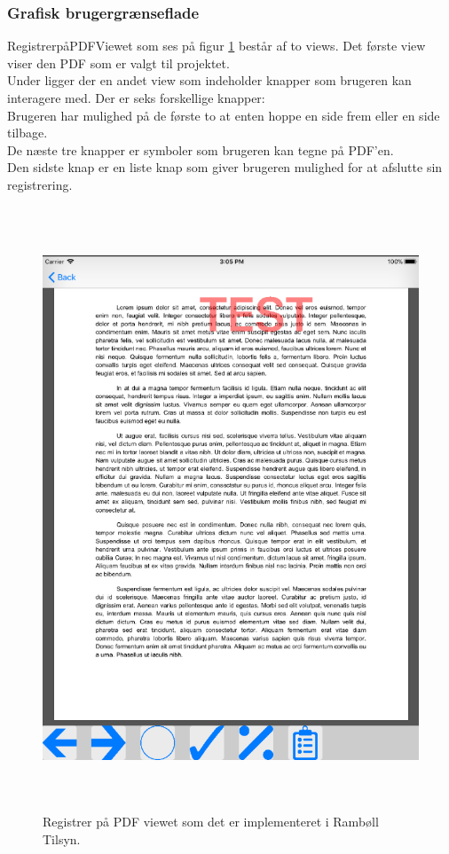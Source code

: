 \subsubsection{Grafisk brugergrænseflade}
RegistrerpåPDFViewet som ses på figur \ref{fig:RegistrerObjekterView} består af to views. Det første view viser den PDF som er valgt til projektet. \\
Under ligger der en andet view som indeholder knapper som brugeren kan interagere med. Der er seks forskellige knapper: \\
Brugeren har mulighed på de første to at enten hoppe en side frem eller en side tilbage. \\
De næste tre knapper er symboler som brugeren kan tegne på PDF'en. \\
Den sidste knap er en liste knap som giver brugeren mulighed for at afslutte sin registrering.
\begin{figure}[H] %
	\centering
	\includegraphics[height=18cm, width=15cm]{../ArkitekturDesign/Design/RegisterPDF/PDF}
	\caption{Registrer på PDF viewet som det er implementeret i Rambøll Tilsyn.}
	\label{fig:RegistrerObjekterView}
\end{figure}

